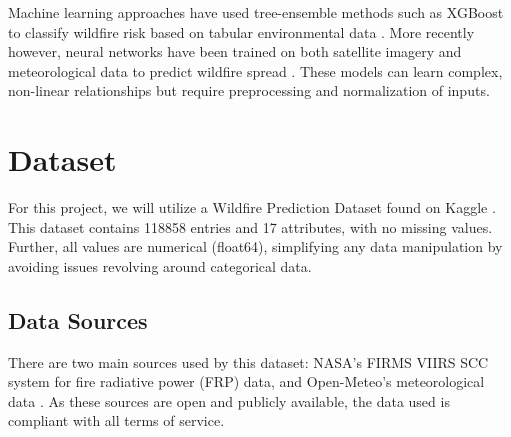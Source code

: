 \documentclass[11pt]{article}
\begin{document}
Machine learning approaches have used tree-ensemble methods such as XGBoost to classify wildfire risk based on tabular environmental data \citet{XGBoost}. More recently however, neural networks have been trained on both satellite imagery
and meteorological data to predict wildfire spread \citet{MLWildfire}. These models can learn complex, non-linear relationships but require preprocessing and normalization of inputs.

\section{Dataset}
For this project, we will utilize a Wildfire Prediction Dataset found on Kaggle \citet{kaggle_dataset}. This dataset contains 118858 entries and 17 attributes, with no missing values. Further, all values are numerical (float64), 
simplifying any data manipulation by avoiding issues revolving around categorical data. 
\subsection{Data Sources}
There are two main sources used by this dataset: NASA's FIRMS VIIRS SCC system for fire radiative power (FRP) data, 
and Open-Meteo's meteorological data \citet{FIRMS, open-meteo-api}. As these sources are open and publicly available, the data used is compliant with all terms of service.
\end{document}
